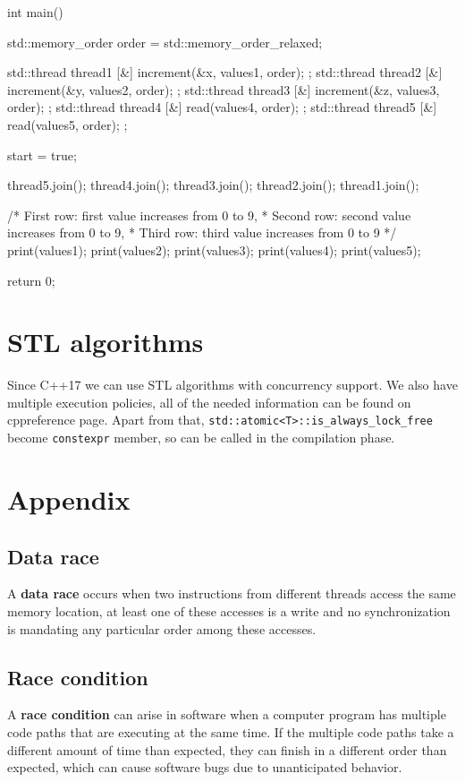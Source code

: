 \documentclass[../main]{subfiles}
\begin{document}
\begin{Code}
    int main()
    {
        std::memory_order order = std::memory_order_relaxed;

        std::thread thread1{ [&] { increment(&x, values1, order); } };
        std::thread thread2{ [&] { increment(&y, values2, order); } };
        std::thread thread3{ [&] { increment(&z, values3, order); } };
        std::thread thread4{ [&] { read(values4, order); } };
        std::thread thread5{ [&] { read(values5, order); } };

        start = true;

        thread5.join();
        thread4.join();
        thread3.join();
        thread2.join();
        thread1.join();

        /* First row: first value increases from 0 to 9,
         * Second row: second value increases from 0 to 9,
         * Third row: third value increases from 0 to 9
         */
        print(values1);
        print(values2);
        print(values3);
        print(values4);
        print(values5);

        return 0;
    }
\end{Code}


\section{STL algorithms}
    Since C++17 we can use STL algorithms with concurrency support. We also have multiple execution policies, all of the needed information can be found on cppreference page.
Apart from that, \texttt{std::atomic<T>::is\_always\_lock\_free} become \texttt{constexpr} member, so can be called in the compilation phase.

\section{Appendix}
\subsection{Data race}
    A \textbf{data race} occurs when two instructions from different threads access the same memory location, at least one of these accesses is a write and
no synchronization is mandating any particular order among these accesses.

\subsection{Race condition}
    A \textbf{race condition} can arise in software when a computer program has multiple code paths that are executing at the same time.
If the multiple code paths take a different amount of time than expected, they can finish in a different order than expected, which can cause software bugs due
to unanticipated behavior.
\end{document}
